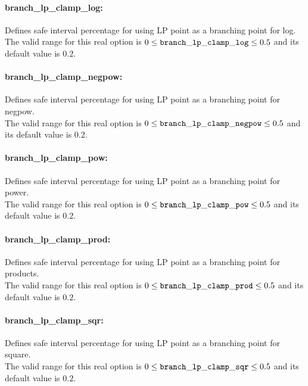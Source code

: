 \paragraph{branch\_lp\_clamp\_log:}\label{sec:branch_lp_clamp_log} Defines safe interval percentage for using LP point as a branching point for log.$\;$ \\
The valid range for this real option is 
$0 \le {\tt branch\_lp\_clamp\_log } \le 0.5$
and its default value is $0.2$.

\paragraph{branch\_lp\_clamp\_negpow:}\label{sec:branch_lp_clamp_negpow} Defines safe interval percentage for using LP point as a branching point for negpow. $\;$ \\
The valid range for this real option is 
$0 \le {\tt branch\_lp\_clamp\_negpow } \le 0.5$
and its default value is $0.2$.

\paragraph{branch\_lp\_clamp\_pow:}\label{sec:branch_lp_clamp_pow} Defines safe interval percentage for using LP point as a branching point for power. $\;$ \\
The valid range for this real option is 
$0 \le {\tt branch\_lp\_clamp\_pow } \le 0.5$
and its default value is $0.2$.

\paragraph{branch\_lp\_clamp\_prod:}\label{sec:branch_lp_clamp_prod} Defines safe interval percentage for using LP point as a branching point for products.$\;$ \\
The valid range for this real option is 
$0 \le {\tt branch\_lp\_clamp\_prod } \le 0.5$
and its default value is $0.2$.

\paragraph{branch\_lp\_clamp\_sqr:}\label{sec:branch_lp_clamp_sqr} Defines safe interval percentage for using LP point as a branching point for square.$\;$ \\
The valid range for this real option is 
$0 \le {\tt branch\_lp\_clamp\_sqr } \le 0.5$
and its default value is $0.2$.


